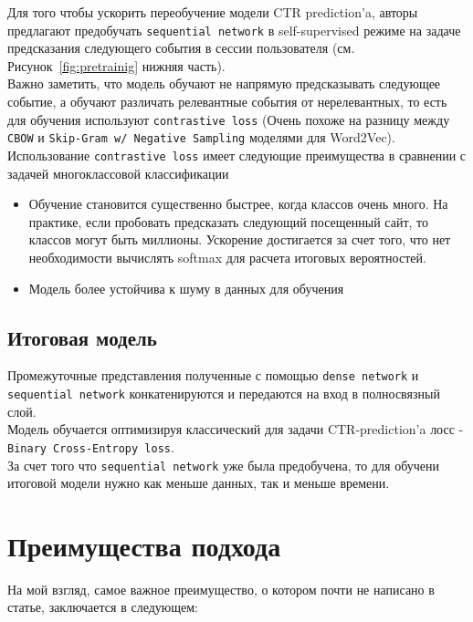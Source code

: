 Для того чтобы ускорить переобучение модели CTR prediction'a, авторы предлагают предобучать \texttt{sequential network} в self-supervised режиме на задаче предсказания следующего события в сессии пользователя (см. Рисунок~\ref{fig:pretrainig} нижняя часть). \\

Важно заметить, что модель обучают не напрямую предсказывать следующее событие, а обучают различать релевантные события от нерелевантных, то есть для обучения используют \texttt{contrastive loss} (Очень похоже на разницу между \texttt{CBOW} и \texttt{Skip-Gram w/ Negative Sampling} моделями для Word2Vec). \\

Использование \texttt{contrastive loss} имеет следующие преимущества в сравнении с задачей многоклассовой классификации
\begin{itemize}
    \item Обучение становится существенно быстрее, когда классов очень много. На практике, если пробовать предсказать следующий посещенный сайт, то классов могут быть миллионы. Ускорение достигается за счет того, что нет необходимости вычислять softmax для расчета итоговых вероятностей.
    \item Модель более устойчива к шуму в данных для обучения
\end{itemize}

\subsection{Итоговая модель}

Промежуточные представления полученные с помощью  \texttt{dense network} и \texttt{sequential network} конкатенируются и передаются на вход в полносвязный слой. \\

Модель обучается оптимизируя классический для задачи CTR-prediction'a лосс - \texttt{Binary Cross-Entropy loss}. \\

За счет того что \texttt{sequential network} уже была предобучена, то для обучени итоговой модели нужно как меньше данных, так и меньше времени.

\section{Преимущества подхода}

На мой взгляд, самое важное преимущество, о котором почти не написано в статье, заключается в следующем: \\

